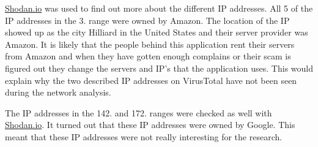 \href{https://www.shodan.io/host/3.14.182.203}{Shodan.io} was used to find out more about the different IP addresses.
All 5 of the IP addresses in the 3. range were owned by Amazon.
The location of the IP showed up as the city Hilliard in the United States and their server provider was Amazon.
It is likely that the people behind this application rent their servers from Amazon and when they have gotten enough complains or their scam is figured out they change the servers and IP’s that the application uses.
This would explain why the two described IP addresses on VirusTotal have not been seen during the network analysis.

The IP addresses in the 142. and 172. ranges were checked as well with \href{https://www.shodan.io/host/172.217.168.234}{Shodan.io}. It turned out that these IP addresses were owned by Google.
This meant that these IP addresses were not really interesting for the research.

